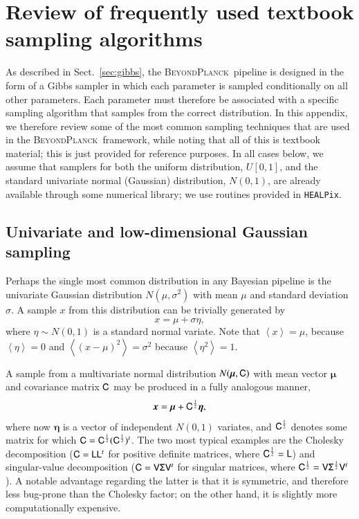 \documentclass[twocolumn]{aa}
\newcommand{\V}[0]{\tens{V}}
\newcommand{\x}[0]{\vec{x}}
\renewcommand{\L}[0]{\tens{L}}
\renewcommand{\C}[0]{\tens{C}}
\newcommand{\BP}{\textsc{BeyondPlanck}}
\newcommand{\HEALPix}[0]{\texttt{HEALPix}}
\begin{document}


\appendix

\section{Review of frequently used textbook sampling algorithms}
\label{app:samplers}

As described in Sect.~\ref{sec:gibbs}, the \BP\ pipeline is designed
in the form of a Gibbs sampler in which each parameter is sampled
conditionally on all other parameters. Each parameter must therefore
be associated with a specific sampling algorithm that samples from the
correct distribution. In this appendix, we therefore review some of
the most common sampling techniques that are used in the
\BP\ framework, while noting that all of this is textbook material;
this is just provided for reference purposes. In all cases below, we
assume that samplers for both the uniform distribution, $U[0,1]$, and
the standard univariate normal (Gaussian) distribution, $N(0,1)$, are
already available through some numerical library; we use routines
provided in \HEALPix.

\subsection{Univariate and low-dimensional Gaussian sampling}
\label{sec:gauss_lowdim}

Perhaps the single most common distribution in any Bayesian pipeline
is the univariate Gaussian distribution $N(\mu,\sigma^2)$ with mean
$\mu$ and standard deviation $\sigma$. A sample $x$ from this
distribution can be trivially generated by
\begin{equation}
  x = \mu + \sigma \eta,
\end{equation}
where $\eta\sim N(0,1)$ is a standard normal variate. Note that
$\left<x\right> = \mu$, because $\left<\eta\right> = 0$ and
$\left<(x-\mu)^2\right> = \sigma^2$ because $\left<\eta^2\right> = 1$.

A sample from a multivariate normal distribution $N(\boldsymbol{\mu}, \C)$
with mean vector $\boldsymbol{\mu}$ and covariance matrix $\C$ may be
produced in a fully analogous manner,
\begin{equation}
  \x = \boldsymbol{\mu} + \C^{\frac{1}{2}} \boldsymbol{\eta},
\end{equation}
where now $\boldsymbol{\eta}$ is a vector of independent $N(0,1)$ variates,
and $\C^{\frac{1}{2}}$ denotes some matrix for which $\C =
\C^{\frac{1}{2}}(\C^{\frac{1}{2}})^t$. The two most typical examples
are the Cholesky decomposition ($\C = \L\L^t$ for positive definite
matrices, where $\C^{\frac{1}{2}} = \L$) and singular-value
decomposition ($\C = \V\tens\Sigma\V^t$ for singular matrices, where
$\C^{\frac{1}{2}} = \V\tens\Sigma^{\frac{1}{2}}\V^t$). A notable advantage
regarding the latter is that it is symmetric, and therefore less
bug-prone than the Cholesky factor; on the other hand, it is slightly
more computationally expensive.
\end{document}
